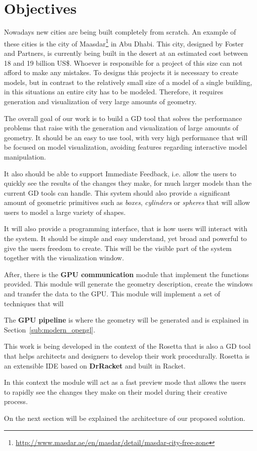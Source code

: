 
% 
% 

\section{Objectives}
\label{sec:objectives}

Nowadays new cities are being built  completely from scratch. An example of these cities is the city of Maasdar\footnote{\url{http://www.masdar.ae/en/masdar/detail/masdar-city-free-zone}} in Abu Dhabi. This city, designed by Foster and Partners, is currently being built in the desert at an estimated cost between 18 and 19 billion US\$. Whoever is responsible for a project of this size can not afford to make any mistakes.
To designs this projects it is necessary to create models, but in contrast to the relatively small size of a model of a single building, in this situations an entire city has to be modeled. Therefore, it requires generation and visualization of very large amounts of geometry.

The overall goal of our work is to build a GD tool that solves the performance problems that raise with the generation and visualization of large amounts of geometry. It should be an easy to use tool, with very high performance that will be focused on model visualization, avoiding features regarding interactive model manipulation.

It also should be able to support Immediate Feedback, i.e. allow the users to quickly see the results of the changes they make, for much larger models than the current GD tools can handle. This system should also provide a significant amount of geometric primitives such as \emph{boxes}, \emph{cylinders} or \emph{spheres} that will allow users to model a large variety of shapes.

It will also provide a programming interface, that is how users will interact with the system. It should be simple and easy understand, yet broad and powerful to give the users freedom to create. This will be the visible part of the system together with the visualization window.

After, there is the \textbf{GPU communication} module that implement the functions provided. This module will generate the geometry description, create the windows and transfer the data to the GPU. This module will implement a set of techniques that will 

The \textbf{GPU pipeline} is where the geometry will be generated and is explained in Section~\ref{sub:modern_opengl}.


This work is being developed in the context of the Rosetta that is also a GD tool that helps architects and designers to develop their work procedurally. Rosetta is an extensible IDE based on \textbf{DrRacket} and built in Racket. 

In this context the module will act as a fast preview mode that allows the users to rapidly see the changes they make on their model during their creative process.

On the next section will be explained the architecture of our proposed solution.
